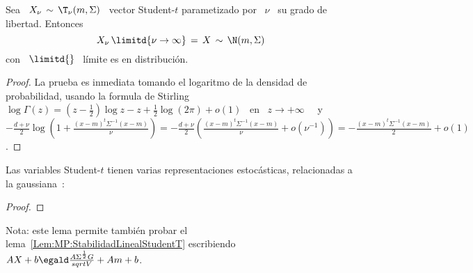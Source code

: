 \begin{lema}
\label{Lem:MP:LimiteStudentTGaussiana}
%
  Sea \ $X_\nu \, \sim \, \T_\nu(m,\Sigma)$ \ vector Student-$t$ parametizado por
  \ $\nu$ \ su grado de libertad. Entonces
  \[
  X_\nu \, \limitd{\nu \to \infty} \, = \, X \, \sim \, \N(m,\Sigma)
  \]
  con \ $\displaystyle \limitd{}$ \ l\'imite es en distribuci\'on.
\end{lema}
\begin{proof}
  La prueba  es inmediata tomando el  logaritmo de la  densidad de probabilidad,
  usando la  formula de Stirling \  $\log\Gamma(z) = \left( z  - \frac12 \right)
  \log z - z  + \frac12 \log(2 \pi) + o(1)$ \  en \ $z \to +\infty$~\cite{Sti30,
    AbrSte70,  GraRyz15} \ y  \ $-\frac{d+\nu}{2}  \log\left( 1  + \frac{(x-m)^t
      \Sigma^{-1}  (x-m)}{\nu} \right)  = -\frac{d+\nu}{2}  \left( \frac{(x-m)^t
      \Sigma^{-1}   (x-m)}{\nu}  +   o\left(  \nu^{-1}   \right)  \right)   =  -
  \frac{(x-m)^t \Sigma^{-1} (x-m)}{2} + o(1)$.
\end{proof}

Las  variables   Student-$t$  tienen  varias   representaciones  estoc\'asticas,
relacionadas a la gaussiana~\cite{FanKot90, And03, KotNad04, AndKau65}:
%
\begin{proof}

\end{proof}
%
Nota:       este       lema        permite       tambi\'en       probar       el
lema~\ref{Lem:MP:StabilidadLinealStudentT} escribiendo \ $A X + b \egald \frac{A
  \Sigma^{\frac12} G}{sqrt{V}} + A m + b$.

